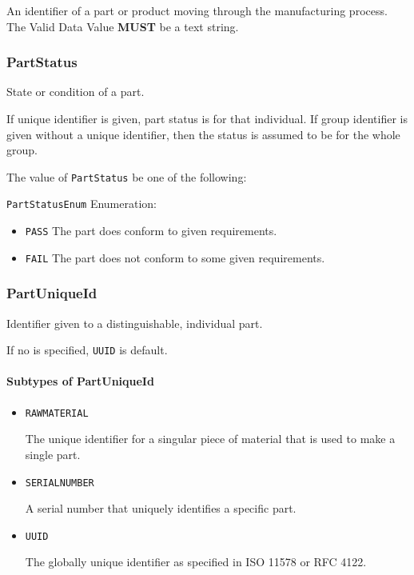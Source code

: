An identifier of a part or product moving through the manufacturing process. 
 The \gls{Valid Data Value} \textbf{MUST} be a text string. 


\subsubsection{PartStatus}
\label{sec:PartStatus}



State or condition of a part.

If unique identifier is given, part status is for that individual. If group identifier is given without a unique identifier, then the status is assumed to be for the whole group.


The value of \texttt{PartStatus} \MUST be one of the following: 


\texttt{PartStatusEnum} Enumeration:

\begin{itemize}
\item \texttt{PASS} \newline The part does conform to given requirements. 
\item \texttt{FAIL} \newline The part does not conform to some given requirements. 
\end{itemize}

\FloatBarrier

\subsubsection{PartUniqueId}
\label{sec:PartUniqueId}



Identifier given to a distinguishable, individual part. 

If no  is specified, \texttt{UUID} is default.



\paragraph{Subtypes of PartUniqueId}\mbox{}
\label{sec:Subtypes of PartUniqueId}

\begin{itemize}

\item \texttt{RAW\textunderscore MATERIAL}


The unique identifier for a singular piece of material that is used to make a single part.

\item \texttt{SERIAL\textunderscore NUMBER}


A serial number that uniquely identifies a specific part.

\item \texttt{UUID}


The globally unique identifier as specified in ISO 11578 or RFC 4122.


\end{itemize}

